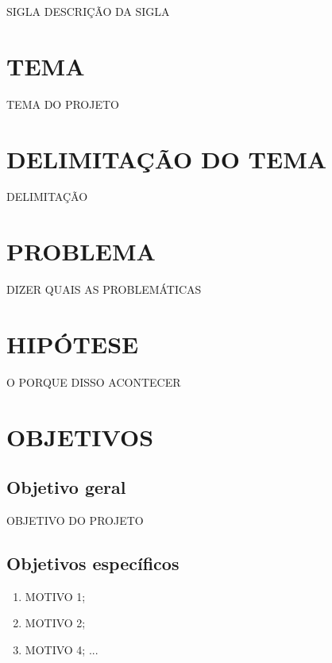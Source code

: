 \documentclass{pre-project}
\begin{document}
\frenchspacing 
\pretextual

\imprimircapa
\imprimirfolhaderosto

\listoffigures*
\cleardoublepage

\listoftables*
\cleardoublepage

\begin{siglas}
	\item [SIGLA] {DESCRIÇÃO DA SIGLA}
\end{siglas}

\tableofcontents*
\cleardoublepage

\textual


\chapter{TEMA}
TEMA DO PROJETO
	
\chapter{DELIMITAÇÃO DO TEMA}	
	DELIMITAÇÃO
	
\chapter{PROBLEMA}
DIZER QUAIS AS PROBLEMÁTICAS
	
\chapter{HIPÓTESE}
O PORQUE DISSO ACONTECER
	
\chapter{OBJETIVOS}
	\section{Objetivo geral}
	OBJETIVO DO PROJETO
	
	\section{Objetivos específicos}
		\begin{enumerate}
			\item MOTIVO 1;
			\item MOTIVO 2;
			\item MOTIVO 4; ...
			\end{enumerate}
\end{document}
